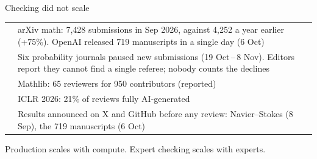 \begin{frame}{Checking did not scale}
  \footnotesize\sffamily
  \renewcommand{\arraystretch}{1.45}
  \begin{tabularx}{\linewidth}{@{}p{2.6cm}Y@{}}
    \toprule
     & \\
    \midrule
     & arXiv math: 7,428 submissions in Sep 2026, against 4,252 a year earlier (+75\%).
      OpenAI released 719 manuscripts in a single day (6 Oct)\\
     & Six probability journals paused new submissions (19 Oct\,--\,8 Nov).
      Editors report they cannot find a single referee; nobody counts the declines\\
     & Mathlib: 65 reviewers for 950 contributors (reported)\\
     & ICLR 2026: 21\% of reviews fully AI-generated\\
     & Results announced on X and GitHub before any review:
      Navier--Stokes (8 Sep), the 719 manuscripts (6 Oct)\\
    \bottomrule
  \end{tabularx}\par\medskip
  {\color{black!60}\scriptsize Production scales with compute. Expert checking scales with experts.}
\end{frame}
